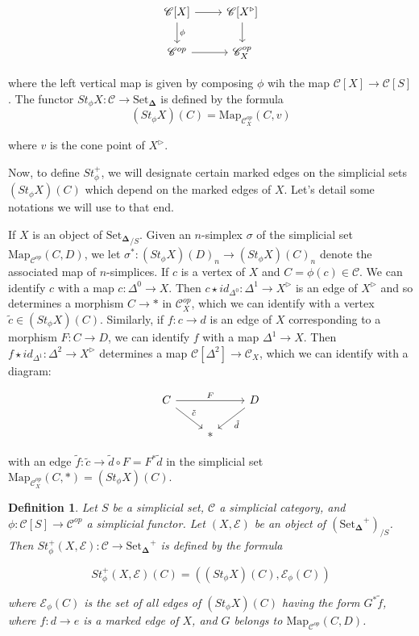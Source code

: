 \documentclass[12pt]{amsart}
\newcommand{\8}{\ensuremath{\infty}}
\newcommand{\C}{\ensuremath{\mathscr{C}}}
\newcommand{\SSet}{\ensuremath{\text{Set}_{\boldsymbol{\Delta}}}}
\newcommand{\Map}{\ensuremath{\text{Map}}}
\newtheorem{definition}{Definition}
\begin{document}
$$
  \begin{tikzcd}
    \mathscr{C}[X]\arrow[r] \arrow[d,"\phi"] &\mathscr{C}[X^\triangleright]\arrow[d]\\
    \C^{op} \arrow[r] &\C^{op}_X
  \end{tikzcd}
$$

where the left vertical map is given by composing $\phi$ wih the map $\mathscr{C}[X]\rightarrow \mathscr{C}[S]$. The functor $St_\phi X: \C\rightarrow \SSet$ is defined by the formula
$$
  (St_\phi X)(C) = \Map_{\C^{op}_X}(C,v)
$$

where $v$ is the cone point of $X^\triangleright$.

Now, to define $St_\phi^+$, we will designate certain marked edges on the simplicial sets $(St_\phi X)(C)$ which depend on the marked edges of $X$. Let's detail some notations we will use to that end.

If $X$ is an object of ${\SSet}_{/S}$. Given an $n$-simplex $\sigma$ of the simplicial set $\Map_{\C^{op}}(C,D)$, we let $\sigma^*:(St_\phi X)(D)_n \rightarrow (St_\phi X)(C)_n$ denote the associated map of $n$-simplices. If $c$ is a vertex of $X$ and $C = \phi(c)\in\C$. We can identify $c$ with a map $c:\Delta^0\rightarrow X$. Then $c\star id_{\Delta^0}:\Delta^1\rightarrow X^\triangleright$ is an edge of $X^\triangleright$ and so determines a morphism $C\rightarrow *$ in $\C^{op}_X$, which we can identify with a vertex $\tilde{c}\in(St_\phi X)(C)$. Similarly, if $f:c\rightarrow d$ is an edge of $X$ corresponding to a morphism $F:C\rightarrow D$, we can identify $f$ with a map $\Delta^1\rightarrow X$. Then $f\star id_{\Delta^1}:\Delta^2 \rightarrow X^\triangleright$ determines a map $\mathscr{C}[\Delta^2]\rightarrow \C_X$, which we can identify with a diagram:

$$
  \begin{tikzcd}
    C\arrow[rr,"F"] \arrow[dr,"\tilde{c}"] &&D\arrow[dl,"\tilde{d}"]\\
    &*
  \end{tikzcd}
$$

with an edge $\tilde{f}:\tilde{c}\rightarrow \tilde{d}\circ F = F^*\tilde{d}$ in the simplicial set $\Map_{\C^{op}_X}(C,*) = (St_\phi X)(C).$

\begin{definition}
  Let $S$ be a simplicial set, $\C$ a simplicial category, and $\phi:\mathscr{C}[S]\rightarrow \C^{op}$ a simplicial functor. Let $(X,\mathcal{E})$ be an object of $(\SSet^+)_{/S}$. Then $St_\phi^+(X,\mathcal{E}):\C\rightarrow \SSet^+$ is defined by the formula

  $$
    St_\phi^+(X,\mathcal{E})(C) = ((St_\phi X)(C),\mathcal{E}_\phi(C))
  $$

  where $\mathcal{E}_\phi (C)$ is the set of all edges of $(St_\phi X)(C)$ having the form $G^*\tilde{f}$, where $f:d\rightarrow e$ is a marked edge of $X$, and $G$ belongs to $\Map_{\C^{op}}(C,D)$.
\end{definition}
\end{document}
